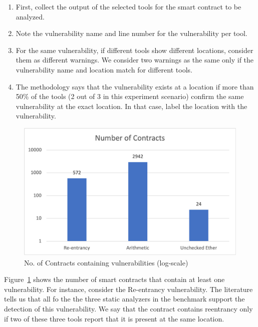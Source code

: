 	\begin{enumerate}
	
	\item First, collect the output of the selected tools for the smart contract to be analyzed.
	
	\item Note the vulnerability name and line number for the vulnerability per tool. 
	
	\item For the same vulnerability, if different tools show different locations, consider them as different warnings.
		We consider two warnings as the same only if the vulnerability name and location match for different tools.
	
	\item The methodology says that the vulnerability exists at a location if more than 50\% of the tools (2 out of 3 in this experiment scenario) confirm the same vulnerability at the exact location.
		In that case, label the location with the vulnerability.
	
	\end{enumerate}
	
	\begin{figure}[t]
		\centering
		\includegraphics[width=1\textwidth]{figures/Picture1.png}
		\caption{No. of Contracts containing vulnerabilities (log-scale)}
		\label{fig:chart_vuln_count}
	\end{figure}
		
		Figure~\ref{fig:chart_vuln_count} shows the number of smart contracts that contain at least one vulnerability.
		For instance, consider the Re-entrancy vulnerability.
		The literature tells us that all fo the the three static analyzers in the benchmark support the detection of this vulnerability.
		We say that the contract contains reentrancy only if two of these three tools report that it is present at the same location.


